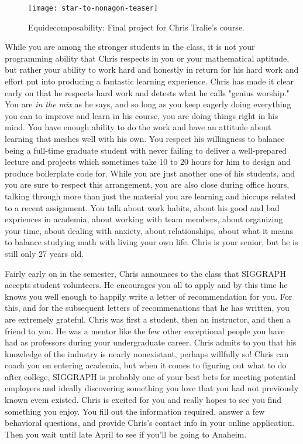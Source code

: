 \documentclass[../main.tex]{subfiles}
\begin{document}
\begin{figure}[h!]
	\centering
	\texttt{[image: star-to-nonagon-teaser]}
	\caption*{Equidecomposability: Final project for Chris Tralie's course.}
\end{figure}

While you are among the stronger students in the class, it is not your programming ability that Chris respects in you or your mathematical aptitude, but rather your ability to work hard and honestly in return for his hard work and effort put into producing a fantastic learning experience. Chris has made it clear early on that he respects hard work and detests what he calls "genius worship." You are \textit{in the mix} as he says, and so long as you keep eagerly doing everything you can to improve and learn in his course, you are doing things right in his mind. You have enough ability to do the work and have an attitude about learning that meshes well with his own. You respect his willingness to balance being a full-time graduate student with never failing to deliver a well-prepared lecture and projects which sometimes take 10 to 20 hours for him to design and produce boilerplate code for. While you are just another one of his students, and you are sure to respect this arrangement, you are also close during office hours, talking through more than just the material you are learning and hiccups related to a recent assignment. You talk about work habits, about his good and bad expriences in academia, about working with team members, about organizing your time, about dealing with anxiety, about relationships, about what it means to balance studying math with living your own life. Chris is your senior, but he is still only 27 years old.

Fairly early on in the semester, Chris announces to the class that SIGGRAPH accepts student volunteers. He encourages you all to apply and by this time he knows you well enough to happily write a letter of recommendation for you. For this, and for the subsequent letters of recommenations that he has written, you are extremely grateful. Chris was first a student, then an instructor, and then a friend to you. He was a mentor like the few other exceptional people you have had as professors during your undergraduate career. Chris admits to you that his knowledge of the industry is nearly nonexistant, perhaps willfully so! Chris can coach you on entering academia, but when it comes to figuring out what to do after college, SIGGRAPH is probably one of your best bets for meeting potential employers and ideally discovering something you love that you had not previously known evem existed. Chris is excited for you and really hopes to see you find something you enjoy. You fill out the information required, answer a few behavioral questions, and provide Chris's contact info in your online application. Then you wait until late April to see if you'll be going to Anaheim.
\end{document}
